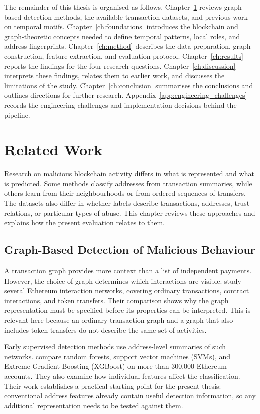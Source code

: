 \documentclass{thesisclass}
\begin{document}
The remainder of this thesis is organised as follows. Chapter~\ref{chap:relatedwork} reviews graph-based detection methods, the available transaction datasets, and previous work on temporal motifs. Chapter~\ref{ch:foundations} introduces the blockchain and graph-theoretic concepts needed to define temporal patterns, local roles, and address fingerprints. Chapter~\ref{ch:method} describes the data preparation, graph construction, feature extraction, and evaluation protocol. Chapter~\ref{ch:results} reports the findings for the four research questions. Chapter~\ref{ch:discussion} interprets these findings, relates them to earlier work, and discusses the limitations of the study. Chapter~\ref{ch:conclusion} summarises the conclusions and outlines directions for further research. Appendix~\ref{app:engineering_challenges} records the engineering challenges and implementation decisions behind the pipeline.

\chapter{Related Work}
\label{chap:relatedwork}

Research on malicious blockchain activity differs in what is represented and
what is predicted. Some methods classify addresses from transaction summaries,
while others learn from their neighbourhoods or from ordered sequences of
transfers. The datasets also differ in whether labels describe transactions,
addresses, trust relations, or particular types of abuse. This chapter reviews
these approaches and explains how the present evaluation relates to them.

\section{Graph-Based Detection of Malicious Behaviour}
\label{sec:related_graph_detection}

A transaction graph provides more context than a list of independent payments.
However, the choice of graph determines which interactions are visible.
\citet{lee2020ethereum} study several Ethereum interaction networks, covering
ordinary transactions, contract interactions, and token transfers. Their
comparison shows why the graph representation must be specified before its
properties can be interpreted. This is relevant here because an ordinary
transaction graph and a graph that also includes token transfers do not describe
the same set of activities.

Early supervised detection methods use address-level summaries of such
networks. \citet{ostapowicz2019detecting} compare random forests, support vector
machines (SVMs), and Extreme Gradient Boosting (XGBoost) on more than 300,000
Ethereum accounts. They also examine how individual features affect the
classification. Their work establishes a practical starting point for the
present thesis: conventional address features already contain useful detection
information, so any additional representation needs to be tested against them.
\end{document}
